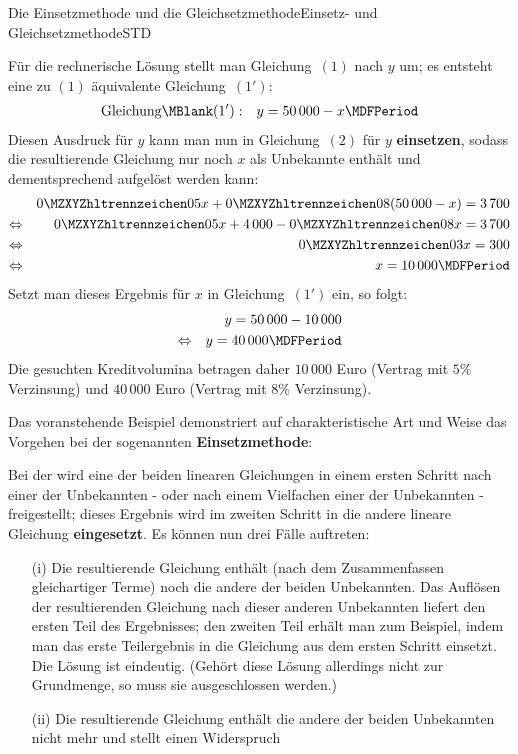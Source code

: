 \begin{MXContent}{Die Einsetzmethode und die Gleichsetzmethode}{Einsetz- und Gleichsetzmethode}{STD}
\begin{MExample}
Für die rechnerische Lösung stellt man Gleichung~$(1)$ nach $y$ um; es entsteht eine zu $(1)$ äquivalente Gleichung~$(1')$:
\begin{eqnarray*}
\mbox{Gleichung}\MBlank (1') & : & y = 50\,000 - x\MDFPeriod 
\end{eqnarray*}
Diesen Ausdruck für $y$ kann man nun in Gleichung~$(2)$ für $y$ \textbf{einsetzen}, sodass die resultierende Gleichung nur noch
$x$ als Unbekannte enthält und dementsprechend aufgelöst werden kann:
\begin{eqnarray*}
& & \MZahl{0}{05} x + \MZahl{0}{08} (50\,000 - x) = 3\,700 \\
\Leftrightarrow & & \MZahl{0}{05} x + 4\,000 - \MZahl{0}{08} x = 3\,700 \\
\Leftrightarrow & & \MZahl{0}{03} x = 300 \\
\Leftrightarrow & & x = 10\,000\MDFPeriod 
\end{eqnarray*}
Setzt man dieses Ergebnis für $x$ in Gleichung~$(1')$ ein, so folgt:
\begin{eqnarray*}
& & y = 50\,000 - 10\,000 \\
\Leftrightarrow & & y = 40\,000\MDFPeriod 
\end{eqnarray*}
Die gesuchten Kreditvolumina betragen daher $10\,000$ Euro (Vertrag mit $5\%$ Verzinsung) und $40\,000$ Euro
(Vertrag mit $8\%$ Verzinsung).
\end{MExample}
Das voranstehende Beispiel demonstriert auf charakteristische Art und Weise das Vorgehen bei der sogenannten
\textbf{Einsetzmethode}:
\begin{MInfo}
Bei der  wird eine der beiden linearen Gleichungen in einem ersten Schritt
nach einer der Unbekannten - oder nach einem Vielfachen einer der Unbekannten - freigestellt; dieses Ergebnis wird im
zweiten Schritt in die andere lineare Gleichung \textbf{eingesetzt}. Es können nun drei Fälle auftreten:
\begin{itemize}
\item[(i)]{Die resultierende Gleichung enthält (nach dem Zusammenfassen gleichartiger Terme)
noch die andere der beiden Unbekannten. Das Auflösen der resultierenden
Gleichung nach dieser anderen Unbekannten liefert den ersten Teil des Ergebnisses; den zweiten Teil erhält man zum Beispiel,
indem man das erste Teilergebnis in die Gleichung aus dem ersten Schritt einsetzt. Die Lösung ist eindeutig. (Gehört
diese Lösung allerdings nicht zur Grundmenge, so muss sie ausgeschlossen werden.)}
\item[(ii)]{Die resultierende Gleichung enthält die andere der beiden Unbekannten nicht mehr und stellt einen Widerspruch
}
\end{itemize}
\end{MInfo}
\end{MXContent}
